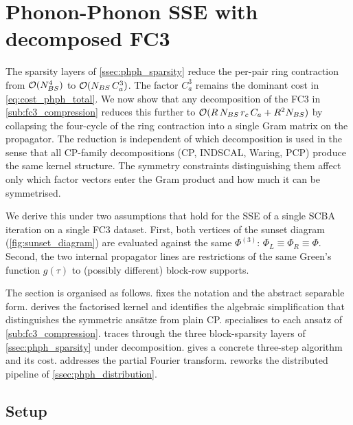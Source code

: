 \section{Phonon-Phonon SSE with decomposed FC3}
\label{sec:phph_decomp}

The sparsity layers of \cref{ssec:phph_sparsity} reduce the per-pair
ring contraction from $\mathcal{O}(N_{BS}^{4})$ to $\mathcal{O}(N_{BS}\,C_a^{3})$. The
factor $C_a^{3}$ remains the dominant cost in
\cref{eq:cost_phph_total}. We now show that any decomposition of the FC3
in \cref{sub:fc3_compression} reduces this further to
$\mathcal{O}(R\,N_{BS}\,r_c\,C_a + R^{2}N_{BS})$ by collapsing the four-cycle of
the ring contraction into a single Gram matrix on the propagator.
The reduction is independent of which decomposition is used in the
sense that all CP-family decompositions (CP, INDSCAL, Waring, PCP) produce
the same kernel structure. The symmetry constraints distinguishing
them affect only which factor vectors enter the Gram product and how
much it can be symmetrised.

We derive this under two assumptions that hold for the SSE of a single
SCBA iteration on a single FC3 dataset. First, both vertices of the
sunset diagram (\cref{fig:sunset_diagram}) are evaluated against the
same $\Phi^{(3)}$: $\Phi_L \equiv \Phi_R \equiv \Phi$. Second, the
two internal propagator lines are restrictions of the same Green's
function $g(\tau)$ to (possibly different) block-row supports.

The section is organised as follows.
 fixes the notation and the abstract
separable form.  derives the factorised
kernel and identifies the algebraic simplification that distinguishes
the symmetric ans\"atze from plain CP.
 specialises to each ansatz of
\cref{sub:fc3_compression}.  traces
through the three block-sparsity layers of \cref{ssec:phph_sparsity}
under decomposition.  gives a concrete
three-step algorithm and its cost. 
addresses the partial Fourier transform.
 reworks the distributed pipeline of
\cref{ssec:phph_distribution}.

\subsection{Setup}
\label{ssec:phph_decomp_setup}

